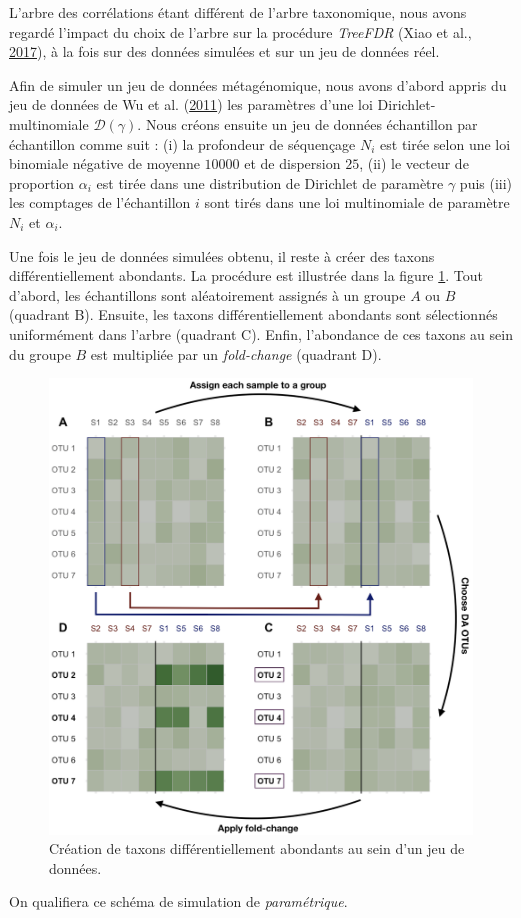 \documentclass[12pt,a4paper]{reedthesis}
\theoremstyle{definition}
\theoremstyle{definition}
\theoremstyle{definition}
\theoremstyle{remark}
\begin{document}
L'arbre des corrélations étant différent de l'arbre taxonomique, nous avons regardé l'impact du choix de l'arbre sur la procédure \emph{TreeFDR} (Xiao et al., \protect\hyperlink{ref-xiao2017false}{2017}), à la fois sur des données simulées et sur un jeu de données réel.

Afin de simuler un jeu de données métagénomique, nous avons d'abord appris du jeu de données de Wu et al. (\protect\hyperlink{ref-wu2011linking}{2011}) les paramètres d'une loi Dirichlet-multinomiale \(\mathcal{D}(\gamma)\). Nous créons ensuite un jeu de données échantillon par échantillon comme suit : (i) la profondeur de séquençage \(N_i\) est tirée selon une loi binomiale négative de moyenne \(10000\) et de dispersion \(25\), (ii) le vecteur de proportion \(\alpha_i\) est tirée dans une distribution de Dirichlet de paramètre \(\gamma\) puis (iii) les comptages de l'échantillon \(i\) sont tirés dans une loi multinomiale de paramètre \(N_i\) et \(\alpha_i\).

Une fois le jeu de données simulées obtenu, il reste à créer des taxons différentiellement abondants. La procédure est illustrée dans la figure \ref{fig:abdiff}. Tout d'abord, les échantillons sont aléatoirement assignés à un groupe \(A\) ou \(B\) (quadrant B). Ensuite, les taxons différentiellement abondants sont sélectionnés uniformément dans l'arbre (quadrant C). Enfin, l'abondance de ces taxons au sein du groupe \(B\) est multipliée par un \emph{fold-change} (quadrant D).


\begin{figure}[!t]

{\centering \includegraphics[width=0.9\linewidth]{img/abdiff} 

}

\caption{Création de taxons différentiellement abondants au sein d'un jeu de données.}\label{fig:abdiff}
\end{figure}
On qualifiera ce schéma de simulation de \emph{paramétrique}.
\end{document}

